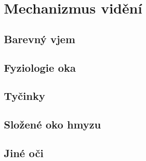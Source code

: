{
\chapter{Mechanizmus vidění}\label{fyz:IchapXXXVI}
\minitoc
  \section{Barevný vjem}\label{fyz:IchapXXXVIsecI}
  \section{Fyziologie oka}\label{fyz:IchapXXXVIsecII}
  \section{Tyčinky}\label{fyz:IchapXXXVIsecIII}
  \section{Složené oko hmyzu}\label{fyz:IchapXXXVIsecIV}
  \section{Jiné oči}\label{fyz:IchapXXXVIsecV}

} %
